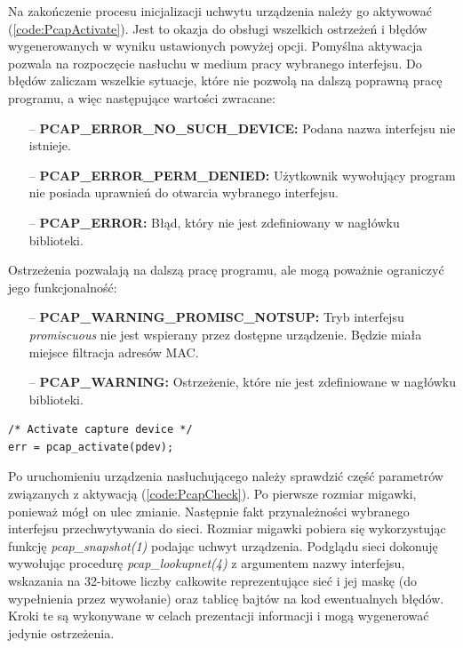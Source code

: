 Na zakończenie procesu inicjalizacji uchwytu urządzenia należy go aktywować (\ref{code:PcapActivate}). Jest to okazja do obsługi wszelkich ostrzeżeń i błędów wygenerowanych w wyniku ustawionych powyżej opcji. Pomyślna aktywacja pozwala na rozpoczęcie nasłuchu w medium pracy wybranego interfejsu. Do błędów zaliczam wszelkie sytuacje, które nie pozwolą na dalszą poprawną pracę programu, a więc następujące wartości zwracane:
\begin{itemize}
\item[--] {\bf PCAP\_ERROR\_NO\_SUCH\_DEVICE:} Podana nazwa interfejsu nie istnieje. 
\item[--] {\bf PCAP\_ERROR\_PERM\_DENIED:} Użytkownik wywołujący program nie posiada uprawnień do otwarcia wybranego interfejsu.
\item[--] {\bf PCAP\_ERROR:} Błąd, który nie jest zdefiniowany w nagłówku biblioteki. 
\end{itemize}
Ostrzeżenia pozwalają na dalszą pracę programu, ale mogą poważnie ograniczyć jego funkcjonalność:
\begin{itemize}
\item[--] {\bf PCAP\_WARNING\_PROMISC\_NOTSUP:} Tryb interfejsu \emph{promiscuous} nie jest wspierany przez dostępne urządzenie. Będzie miała miejsce filtracja adresów MAC.
\item[--] {\bf PCAP\_WARNING:} Ostrzeżenie, które nie jest zdefiniowane w nagłówku biblioteki.
\end{itemize}

\begin{lstlisting}[frame=tb]
/* Activate capture device */                                        
err = pcap_activate(pdev);
\end{lstlisting}

Po uruchomieniu urządzenia nasłuchującego należy sprawdzić część parametrów związanych z aktywacją (\ref{code:PcapCheck}). Po pierwsze rozmiar migawki, ponieważ mógł on ulec zmianie. Następnie fakt przynależności wybranego interfejsu przechwytywania do sieci. Rozmiar migawki pobiera się wykorzystując funkcję \emph{pcap\_snapshot(1)} podając uchwyt urządzenia. Podglądu sieci dokonuję wywołując procedurę \emph{pcap\_lookupnet(4)} z argumentem nazwy interfejsu, wskazania na 32-bitowe liczby całkowite reprezentujące sieć i jej maskę (do wypełnienia przez wywołanie) oraz tablicę bajtów na kod ewentualnych błędów. Kroki te są wykonywane w celach prezentacji informacji i mogą wygenerować jedynie ostrzeżenia.

